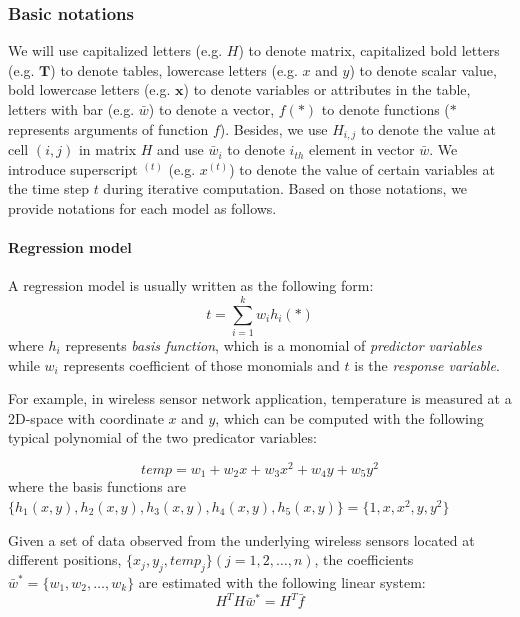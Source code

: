 \subsubsection{Basic notations}
We will use capitalized letters (e.g. $H$) to denote matrix, capitalized bold letters (e.g. $\textbf{T}$) to denote tables, lowercase letters (e.g. $x$ and $y$) to denote scalar value, bold lowercase letters (e.g. $\textbf{x}$) to denote variables or attributes in the table, letters with bar (e.g. $\bar{w}$) to denote a vector, $f(*)$ to denote functions ($*$ represents arguments of function $f$). Besides, we use $H_{i,j}$ to denote the value at cell $(i,j)$ in matrix $H$ and use $\bar{w}_i$ to denote $i_{th}$ element in vector $\bar{w}$. We introduce superscript $^{(t)}$ (e.g. $x^{(t)}$) to denote the value of certain variables at the time step $t$ during iterative computation. Based on those notations, we provide notations for each model as follows.

\paragraph{Regression model}
A regression model is usually written as the following form:
\begin{equation}
t=\sum_{i=1}^kw_ih_i(*)
\end{equation}
where $h_i$ represents {\em basis function}, which is a monomial of {\em predictor variables} while $w_i$ represents coefficient of those monomials and $t$ is the {\em response variable}.

For example, in wireless sensor network application, temperature is measured at a 2D-space with coordinate $x$ and $y$, which can be computed with the following typical polynomial of the two predicator variables:

\begin{equation}
temp=w_1 + w_2x+w_3x^2 + w_4y+w_5y^2
\end{equation}
where the basis functions are $\{h_1(x,y), h_2(x,y), h_3(x,y),h_4(x,y), h_5(x,y)\}=\{1, x, x^2, y, y^2\}$

Given a set of data observed from the underlying wireless sensors located at different positions, $\{x_j,y_j,temp_j\}(j=1,2,\dots,n)$, the coefficients $\bar{w}^* = \{w_1,w_2,\dots,w_k\}$ are estimated with the following linear system:
\begin{equation}\label{eq: regression_solve}
    H^TH\bar{w}^*=H^T\bar{f}
\end{equation}

